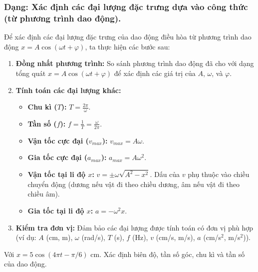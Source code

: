 \subsubsection{Dạng: Xác định các đại lượng đặc trưng dựa vào công thức (từ phương trình dao động).}
\begin{phuongphap}
Để xác định các đại lượng đặc trưng của dao động điều hòa từ phương trình dao động $x = A\cos(\omega t + \varphi)$, ta thực hiện các bước sau:
\begin{enumerate}
    \item \textbf{Đồng nhất phương trình:} So sánh phương trình dao động đã cho với dạng tổng quát $x = A\cos(\omega t + \varphi)$ để xác định các giá trị của $A$, $\omega$, và $\varphi$.
    \item \textbf{Tính toán các đại lượng khác:}
    \begin{itemize}
        \item \textbf{Chu kì ($T$):} $T = \frac{2\pi}{\omega}$.
        \item \textbf{Tần số ($f$):} $f = \frac{1}{T} = \frac{\omega}{2\pi}$.
        \item \textbf{Vận tốc cực đại ($v_{max}$):} $v_{max} = A\omega$.
        \item \textbf{Gia tốc cực đại ($a_{max}$):} $a_{max} = A\omega^2$.
        \item \textbf{Vận tốc tại li độ $x$:} $v = \pm \omega \sqrt{A^2 - x^2}$. Dấu của $v$ phụ thuộc vào chiều chuyển động (dương nếu vật đi theo chiều dương, âm nếu vật đi theo chiều âm).
        \item \textbf{Gia tốc tại li độ $x$:} $a = -\omega^2 x$.
    \end{itemize}
    \item \textbf{Kiểm tra đơn vị:} Đảm bảo các đại lượng được tính toán có đơn vị phù hợp (ví dụ: $A$ (cm, m), $\omega$ (rad/s), $T$ (s), $f$ (Hz), $v$ (cm/s, m/s), $a$ (cm/s$^2$, m/s$^2$)).
\end{enumerate}
\end{phuongphap}
\begin{vidumau}
Với $x=5\cos(4\pi t-\pi/6)$ cm. Xác định biên độ, tần số góc, chu kì và tần số của dao động.
\end{vidumau}

